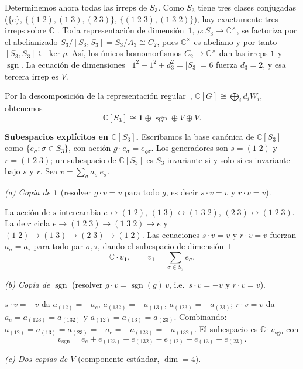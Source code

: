 \documentclass[10pt,a4paper]{article}
\newcommand{\CC}{\mathbb{C}}
\begin{document}
Determinemos ahora todas las irreps de $S_3$.
Como $S_3$ tiene tres clases conjugadas
($\{e\}$, $\{(1\;2),(1\;3),(2\;3)\}$, $\{(1\;2\;3),(1\;3\;2)\}$),
hay exactamente tres irreps sobre $\CC$
\cite[Thm.~4.4.8]{Steinberg}.
Toda representación de dimensión~$1$, $\rho\colon S_3\to\CC^{\times}$,
se factoriza por el abelianizado $S_3/[S_3,S_3]=S_3/A_3\cong C_2$,
pues $\CC^{\times}$ es abeliano y por tanto $[S_3,S_3]\subseteq\ker\rho$.
Así, los únicos homomorfismos $C_2\to\CC^{\times}$ dan las irreps
$\mathbf 1$ y $\operatorname{sgn}$.
La ecuación de dimensiones~\cite[Cor.~4.4.5]{Steinberg}
$1^2+1^2+d_3^2=|S_3|=6$ fuerza $d_3=2$, y esa tercera irrep es $V$.

Por la descomposición de la representación
regular~\cite[Thm.~4.4.4]{Steinberg},
$\CC[G]\cong\bigoplus_i d_iW_i$, obtenemos
\[
  \CC[S_3]\cong \mathbf 1\oplus \operatorname{sgn}\oplus V\oplus V.
\]

\medskip\noindent\textbf{Subespacios explícitos en $\CC[S_3]$.}
Escribamos la base canónica de $\CC[S_3]$ como
$\{e_\sigma:\sigma\in S_3\}$, con acción $g\cdot e_\sigma=e_{g\sigma}$.
Los generadores son $s=(1\;2)$ y $r=(1\;2\;3)$; un subespacio de
$\CC[S_3]$ es $S_3$-invariante si y solo si es invariante bajo $s$ y $r$.
Sea $v=\sum_\sigma a_\sigma\,e_\sigma$.

\smallskip\noindent\emph{(a) Copia de\/ $\mathbf 1$}
(resolver $g\cdot v=v$ para todo $g$, es decir $s\cdot v=v$ y $r\cdot v=v$).

La acción de $s$ intercambia $e\leftrightarrow(1\;2)$,
$(1\;3)\leftrightarrow(1\;3\;2)$, $(2\;3)\leftrightarrow(1\;2\;3)$.
La de $r$ cicla $e\to(1\;2\;3)\to(1\;3\;2)\to e$ y
$(1\;2)\to(1\;3)\to(2\;3)\to(1\;2)$.
Las ecuaciones $s\cdot v=v$ y $r\cdot v=v$ fuerzan
$a_\sigma=a_\tau$ para todo par $\sigma,\tau$, dando
el subespacio de dimensión~$1$
\[
  \CC\cdot v_{\mathbf 1},
  \qquad
  v_{\mathbf 1}=\sum_{\sigma\in S_3}e_\sigma.
\]

\smallskip\noindent\emph{(b) Copia de\/ $\operatorname{sgn}$}
(resolver $g\cdot v=\operatorname{sgn}(g)\,v$,
i.e.\ $s\cdot v=-v$ y $r\cdot v=v$).

$s\cdot v=-v$ da $a_{(12)}=-a_e$, $a_{(132)}=-a_{(13)}$,
$a_{(123)}=-a_{(23)}$; $r\cdot v=v$ da
$a_e=a_{(123)}=a_{(132)}$ y $a_{(12)}=a_{(13)}=a_{(23)}$.
Combinando: $a_{(12)}=a_{(13)}=a_{(23)}=-a_e=-a_{(123)}=-a_{(132)}$.
El subespacio es $\CC\cdot v_{\operatorname{sgn}}$ con
\[
  v_{\operatorname{sgn}}
    = e_e+e_{(123)}+e_{(132)}-e_{(12)}-e_{(13)}-e_{(23)}.
\]

\smallskip\noindent\emph{(c) Dos copias de\/ $V$}
(componente estándar, $\dim=4$).
\end{document}
